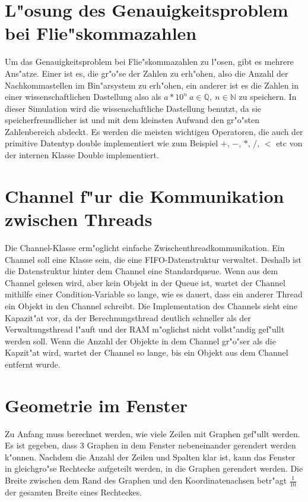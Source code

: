 \documentclass[14pt, a4paper]{report}
\begin{document}
\section{L"osung des Genauigkeitsproblem bei Flie"skommazahlen}
Um das Genauigkeitsproblem bei Flie"skommazahlen zu l"osen, gibt es mehrere Ans"atze.
Einer ist es, die gr"o"se der Zahlen zu erh"ohen, also die Anzahl der Nachkommastellen im
Bin"arsystem zu erh"ohen, ein anderer ist es die Zahlen in einer wissenschaftlichen
Dastellung also als $a * 10^n ~ a \in \mathbb Q, ~ n \in \mathbb N$ zu speichern. In
dieser Simulation wird die wissenschaftliche Dastellung benutzt, da sie 
speicherfreundlicher ist und mit dem kleinsten Aufwand den gr"o"sten Zahlenbereich
abdeckt. Es werden die meisten wichtigen Operatoren, die auch der primitive Datentyp double 
implementiert wie zum Beispiel $+$, $-$, $*$, $/$, $<$ etc von der internen Klasse Double
implementiert.

\section{Channel f"ur die Kommunikation zwischen Threads}
Die Channel-Klasse erm"oglicht einfache Zwischenthreadkommunikation. Ein Channel soll
eine Klasse sein, die eine FIFO-Datenstruktur verwaltet. Deshalb ist die Datenstruktur
hinter dem Channel eine Standardqueue. Wenn aus dem Channel gelesen wird, aber kein 
Objekt in der Queue ist, wartet der Channel mithilfe einer Condition-Variable so lange, 
wie es dauert, dass ein anderer
Thread ein Objekt in den Channel schreibt. Die Implementation des Channels sieht
eine Kapazit"at vor, da der Berechnungsthread deutlich schneller als der 
Verwaltungsthread l"auft und der RAM m"oglichst nicht vollst"andig gef"ullt werden soll.
Wenn die Anzahl der Objekte in dem Channel gr"o"ser als die Kapzit"at wird, wartet der 
Channel so lange, bis ein Objekt aus dem Channel entfernt wurde.

\section{Geometrie im Fenster}
Zu Anfang muss berechnet werden, wie viele Zeilen mit Graphen gef"ullt werden. Es ist
gegeben, dass 3 Graphen in dem Fenster nebeneinander gerendert werden k"onnen. 
Nachdem die 
Anzahl der Zeilen und Spalten klar ist, kann das Fenster in gleichgro"se Rechtecke
aufgeteilt werden, in die Graphen gerendert werden. Die Breite zwischen dem Rand des 
Graphen und den Koordinatenachsen betr"agt $\frac{1}{10}$ der gesamten Breite eines
Rechteckes.
\end{document}
